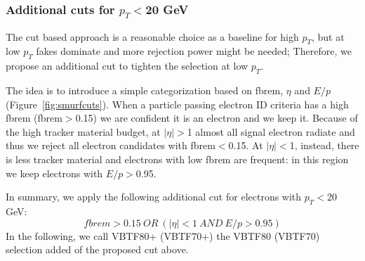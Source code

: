 \subsubsection{Additional cuts for $p_T<$20 GeV}

The cut based approach is a reasonable choice as a baseline for high $p_T$, but at low $p_T$ fakes dominate and more rejection power might be needed; 
Therefore, we propose an additional cut to tighten the selection at low $p_T$.

The idea is to introduce a simple categorization based on fbrem, $\eta$ and $E/p$ (Figure~\ref{fig:smurfcuts}).
When a particle passing electron ID criteria has a high fbrem (fbrem$>$0.15) we are confident it is an electron and we keep it.
Because of the high tracker material budget, at $|\eta|>$1 almost all signal electron radiate and thus we reject all electron candidates with fbrem$<$0.15.
At $|\eta|<$1, instead, there is less tracker material and electrons with low fbrem are frequent: in this region we keep electrons with $E/p>$0.95.

In summary, we apply the following additional cut for electrons with $p_T<$20 GeV:
\begin{equation}
fbrem>0.15~OR~(|\eta|<1~AND~E/p>0.95)
\end{equation}
In the following, we call VBTF80+ (VBTF70+) the VBTF80 (VBTF70) selection added of the proposed cut above.

